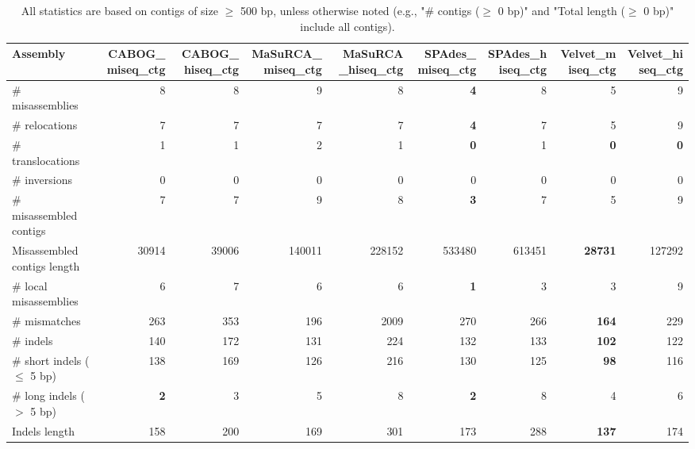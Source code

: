 \documentclass[12pt,a4paper]{article}
\begin{document}
\begin{table}[ht]
\begin{center}
\caption{All statistics are based on contigs of size $\geq$ 500 bp, unless otherwise noted (e.g., "\# contigs ($\geq$ 0 bp)" and "Total length ($\geq$ 0 bp)" include all contigs).}
\begin{tabular}{|l*{8}{|r}|}
\hline
Assembly & CABOG\_miseq\_ctg & CABOG\_hiseq\_ctg & MaSuRCA\_miseq\_ctg & MaSuRCA\_hiseq\_ctg & SPAdes\_miseq\_ctg & SPAdes\_hiseq\_ctg & Velvet\_miseq\_ctg & Velvet\_hiseq\_ctg \\ \hline
\# misassemblies & 8 & 8 & 9 & 8 & {\bf 4} & 8 & 5 & 9 \\ \hline
\hspace{5mm}\# relocations & 7 & 7 & 7 & 7 & {\bf 4} & 7 & 5 & 9 \\ \hline
\hspace{5mm}\# translocations & 1 & 1 & 2 & 1 & {\bf 0} & 1 & {\bf 0} & {\bf 0} \\ \hline
\hspace{5mm}\# inversions & 0 & 0 & 0 & 0 & 0 & 0 & 0 & 0 \\ \hline
\# misassembled contigs & 7 & 7 & 9 & 8 & {\bf 3} & 7 & 5 & 9 \\ \hline
Misassembled contigs length & 30914 & 39006 & 140011 & 228152 & 533480 & 613451 & {\bf 28731} & 127292 \\ \hline
\# local misassemblies & 6 & 7 & 6 & 6 & {\bf 1} & 3 & 3 & 9 \\ \hline
\# mismatches & 263 & 353 & 196 & 2009 & 270 & 266 & {\bf 164} & 229 \\ \hline
\# indels & 140 & 172 & 131 & 224 & 132 & 133 & {\bf 102} & 122 \\ \hline
\hspace{5mm}\# short indels ($\leq$ 5 bp) & 138 & 169 & 126 & 216 & 130 & 125 & {\bf 98} & 116 \\ \hline
\hspace{5mm}\# long indels ($>$ 5 bp) & {\bf 2} & 3 & 5 & 8 & {\bf 2} & 8 & 4 & 6 \\ \hline
Indels length & 158 & 200 & 169 & 301 & 173 & 288 & {\bf 137} & 174 \\ \hline
\end{tabular}
\end{center}
\end{table}
\end{document}
